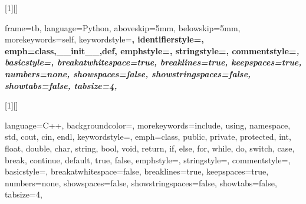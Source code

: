 
\usepackage{amsmath}
\usepackage{graphicx}
\usepackage{amssymb}
\usepackage{listings}
\usepackage{float}
\usepackage{color}
\usepackage{xcolor}



\newcommand\pythonstyle
{\lstset
    {
        frame=tb,
        language=Python,
        aboveskip=5mm,
        belowskip=5mm,
        morekeywords={self},
        keywordstyle=\bfseries\color{deepblue},
        identifierstyle=\color{blue},
        emph={class,__init__,def},
        emphstyle=\ttfamily\color{deepred},
        stringstyle=\color{deepgreen},
        commentstyle=\itshape\color{codegreen},
        basicstyle=\ttfamily,
        breakatwhitespace=true,
        breaklines=true,
        keepspaces=true,
        numbers=none,
        showspaces=false,
        showstringspaces=false,
        showtabs=false,
        tabsize=4,
    }
}

\newcommand\cppstyle
{\lstset
    {
        language=C++,
        backgroundcolor=\color{backcolour},
        morekeywords={include, using, namespace, std, cout, cin, endl},
        keywordstyle=\ttfamily\color{deepblue},
        emph={class, public, private, protected, int, float, double, char, string, bool, void, return, if, else, for, while, do, switch, case, break, continue, default, true, false},
        emphstyle=\ttfamily\color{deepred},
        stringstyle=\color{deepgreen},
        commentstyle=\color{codegreen},
        basicstyle=\ttfamily\footnotesize,
        breakatwhitespace=false,
        breaklines=true,
        keepspaces=true,
        numbers=none,
        showspaces=false,
        showstringspaces=false,
        showtabs=false,
        tabsize=4,
    }
}

[1][]
    {
    \pythonstyle
    \lstset{#1}
    }
{}

[1][]
{
\cppstyle
\lstset{#1}
}
{}

\newcommand\pythoninline[1]{{\pythonstyle\lstinline!#1!}}
\newcommand\cppinline[1]{{\cppstyle\lstinline!#1!}}